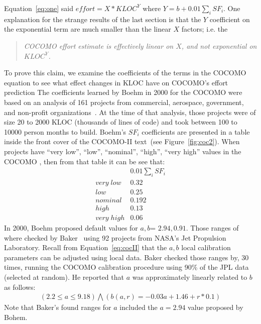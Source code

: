 \documentclass[final,twocolumn]{elsarticle}
\newcommand{\fig}[1]{Figure~\ref{fig:#1}}
\newcommand{\eq}[1]{Equation~\ref{eq:#1}}
\theoremstyle{break}
\begin{document}
 \eq{one} said  \mbox{$\mathit{effort} = \mathit{X*KLOC}^Y$}
 where \mbox{$Y={b + 0.01 \sum_i SF_i}$}.
 One explanation for the strange results of the last section is
 that the $Y$ coefficient on the exponential term are much smaller than the
 linear $X$ factors; i.e. the
 \begin{quote}
   {\em COCOMO effort estimate is
     effectively linear on $X$, and not exponential on $\mathit{KLOC^Y}$.}
 \end{quote}
 To prove this claim, we examine the coefficients of the terms in the COCOMO equation to
 see what effect changes in KLOC have on COCOMO's effort prediction
The coefficients learned by Boehm in 2000 for the
COCOMO were based on an analysis of 
161 projects from commercial, aerospace, government, and non-profit organizations~\cite{boehm00b}. At the time of that analysis,
those  projects   were of size 20 to 2000 KLOC (thousands of lines of code) and took between 100 to 10000 person months to build.
Boehm's   $SF_i$ coefficients
are presented in a table inside the front cover of the COCOMO-II text~\cite{boehm00a}(see \fig{coc2}).
When
  projects have ``very low'', ``low'', ``nominal'', ``high'', ``very high'' values in the COCOMO , then from that table it can be see that:
\begin{equation}\label{eq:sf1}
\begin{array}{r|l}
  &0.01 \sum_i  SF_i \\\hline
\mathit{very\; low} & 0.32\\
\mathit{  low} &   0.25\\
\mathit{nominal} &  0.192\\
\mathit{high} &  0.13\\
\mathit{very\; high} &  0.06  
\end{array}
\end{equation}
In 2000, Boehm proposed default values for $a,b$= $2.94,0.91$.
Those ranges of   where checked    by Baker~\cite{baker07} 
using 92 projects from NASA's Jet Propulsion Laboratory.  Recall from \eq{cocII}
that the $a,b$ local calibration parameters can be adjusted using local data. 
Baker checked those ranges by,  30 times, running the COCOMO
calibration procedure using 90\% of the JPL data (selected
at random). He reported that
 $a$ was approximately linearly related to $b$ as follows:
\[
\begin{array}{c}
\left(2.2 \le a \le 9.18\right) \bigwedge  \left(b(a,r) = -0.03a + 1.46 + r*0.1\right)
\end{array}
\]
Note that Baker's found ranges for $a$ included the $a=2.94$ value proposed by Bohem.
\end{document}
